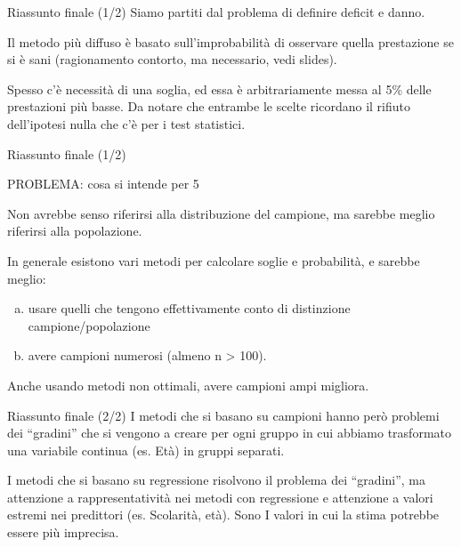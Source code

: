 \documentclass[
  ignorenonframetext,
]{beamer}
\begin{document}
\begin{frame}{Riassunto finale (1/2)}
\label{riassunto-finale-12}
Siamo partiti dal problema di definire deficit e danno.

Il metodo più diffuso è basato sull'improbabilità di osservare quella
prestazione se si è sani (ragionamento contorto, ma necessario, vedi
slides).

Spesso c'è necessità di una soglia, ed essa è arbitrariamente messa al
5\% delle prestazioni più basse. Da notare che entrambe le scelte
ricordano il rifiuto dell'ipotesi nulla che c'è per i test statistici.
\end{frame}

\begin{frame}{Riassunto finale (1/2)}
\label{riassunto-finale-12-1}
\begin{center}
PROBLEMA: cosa si intende per 5%
\end{center}

Non avrebbe senso riferirsi alla distribuzione del campione, ma sarebbe
meglio riferirsi alla popolazione.

In generale esistono vari metodi per calcolare soglie e probabilità, e
sarebbe meglio:

\begin{enumerate}
[a)]
\item
  usare quelli che tengono effettivamente conto di distinzione
  campione/popolazione
\item
  avere campioni numerosi (almeno n \textgreater{} 100).
\end{enumerate}

Anche usando metodi non ottimali, avere campioni ampi migliora.
\end{frame}

\begin{frame}{Riassunto finale (2/2)}
\label{riassunto-finale-22}
I metodi che si basano su campioni hanno però problemi dei ``gradini''
che si vengono a creare per ogni gruppo in cui abbiamo trasformato una
variabile continua (es. Età) in gruppi separati.

I metodi che si basano su regressione risolvono il problema dei
``gradini'', ma attenzione a rappresentatività nei metodi con
regressione e attenzione a valori estremi nei predittori (es. Scolarità,
età). Sono I valori in cui la stima potrebbe essere più imprecisa.
\end{frame}
\end{document}

